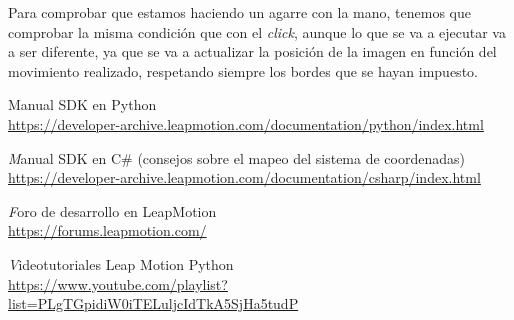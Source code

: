 \documentclass[11pt,a4paper]{article}
\begin{document}
Para comprobar que estamos haciendo un agarre con la mano, tenemos que comprobar la misma condición que con el \textit{click}, aunque lo que se va
a ejecutar va a ser diferente, ya que se va a actualizar la posición de la imagen en función del movimiento realizado, respetando siempre los bordes
que se hayan impuesto.

\newpage

\begin{thebibliography}{5}
Manual SDK en Python
\\\url{https://developer-archive.leapmotion.com/documentation/python/index.html}

\textit
Manual SDK en C\# (consejos sobre el mapeo del sistema de coordenadas)
\\\url{https://developer-archive.leapmotion.com/documentation/csharp/index.html}

\textit
Foro de desarrollo en LeapMotion
\\\url{https://forums.leapmotion.com/}

\textit
Videotutoriales Leap Motion Python
\\\url{https://www.youtube.com/playlist?list=PLgTGpidiW0iTELuljcIdTkA5SjHa5tudP}
\end{thebibliography}
\end{document}
